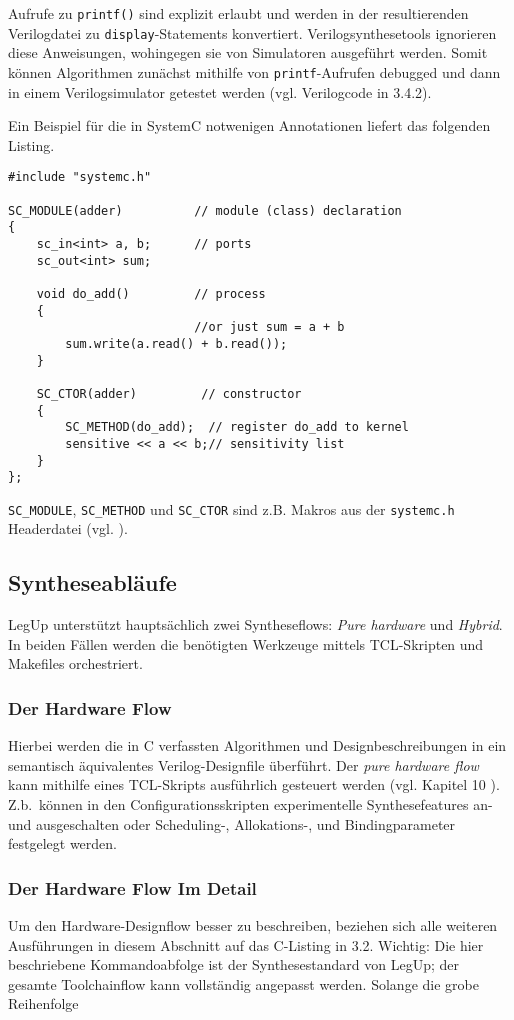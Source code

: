 \documentclass[oneside,a4paper]{article}
\def\V#1{\lstinline[style=verilog]{#1}}
\def\C#1{\lstinline[style=c]{#1}}
\begin{document}
Aufrufe zu \C{printf()} sind explizit erlaubt und werden
in der resultierenden Verilogdatei zu \V{display}-Statements konvertiert.
Verilogsynthesetools ignorieren diese Anweisungen, wohingegen sie von
Simulatoren ausgeführt werden. Somit können Algorithmen zunächst
mithilfe von \C{printf}-Aufrufen debugged und dann in einem Verilogsimulator
getestet werden (vgl. Verilogcode in 3.4.2).

Ein Beispiel für die in SystemC notwenigen Annotationen liefert
das folgenden Listing.

\begin{lstlisting}[style=c++,caption={SystemC Beispiel},label=systemc]
#include "systemc.h"

SC_MODULE(adder)          // module (class) declaration
{
    sc_in<int> a, b;      // ports
    sc_out<int> sum;

    void do_add()         // process
    {
                          //or just sum = a + b
        sum.write(a.read() + b.read());
    }

    SC_CTOR(adder)         // constructor
    {
        SC_METHOD(do_add);  // register do_add to kernel
        sensitive << a << b;// sensitivity list
    }
};
\end{lstlisting}

\C{SC_MODULE}, \C{SC_METHOD} und \C{SC_CTOR} sind z.B. Makros
aus der \C{systemc.h} Headerdatei (vgl. \cite{WIKI01}).

\subsection{Syntheseabläufe}
LegUp unterstützt hauptsächlich zwei Syntheseflows: \emph{Pure hardware}
und \emph{Hybrid}. In beiden Fällen werden die benötigten
Werkzeuge mittels TCL-Skripten und Makefiles orchestriert.

\subsubsection{Der Hardware Flow}
Hierbei werden die in C verfassten Algorithmen und Designbeschreibungen
in ein semantisch äquivalentes Verilog-Designfile überführt. Der
\emph{pure hardware flow} kann mithilfe eines TCL-Skripts ausführlich
gesteuert werden (vgl. Kapitel 10 \cite{LEGUP}). Z.b.\ können
in den Configurationsskripten experimentelle Synthesefeatures
an- und ausgeschalten oder Scheduling-, Allokations-, und Bindingparameter
festgelegt werden.

\subsubsection{Der Hardware Flow Im Detail}
Um den Hardware-Designflow besser zu beschreiben, beziehen sich alle weiteren
Ausführungen in diesem Abschnitt auf das C-Listing in 3.2.
Wichtig: Die hier beschriebene Kommandoabfolge ist der Synthesestandard von LegUp;
der gesamte Toolchainflow kann vollständig angepasst werden. Solange die
grobe Reihenfolge
\end{document}
